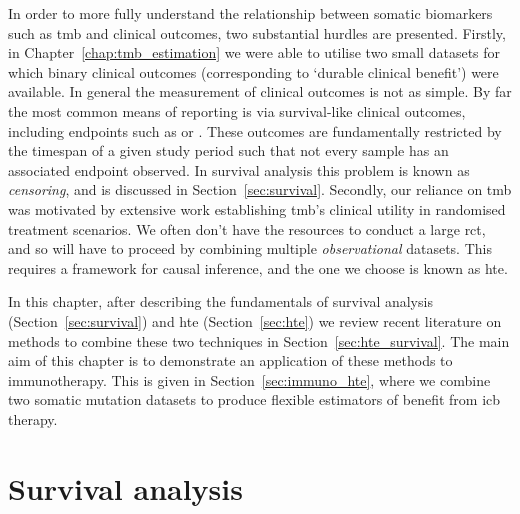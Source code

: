 \documentclass[../thesis.tex]{subfiles}
\begin{document}
In order to more fully understand the relationship between somatic biomarkers such as \gls{tmb} and clinical outcomes, two substantial hurdles are presented. Firstly, in Chapter~\ref{chap:tmb_estimation} we were able to utilise two small datasets for which binary clinical outcomes (corresponding to `durable clinical benefit') were available. In general the measurement of clinical outcomes is not as simple. By far the most common means of reporting is via survival-like clinical outcomes, including endpoints such as  or . These outcomes are fundamentally restricted by the timespan of a given study period such that not every sample has an associated endpoint observed. In survival analysis this problem is known as \textit{censoring}, and is discussed in Section~\ref{sec:survival}. Secondly, our reliance on \gls{tmb} was motivated by extensive work establishing \gls{tmb}'s clinical utility in randomised treatment scenarios. We often don't have the resources to conduct a large \gls{rct}, and so will have to proceed by combining multiple \emph{observational} datasets. This requires a framework for causal inference, and the one we choose is known as \gls{hte}.

In this chapter, after describing the fundamentals of survival analysis (Section~\ref{sec:survival}) and \gls{hte} (Section~\ref{sec:hte}) we review recent literature on methods to combine these two techniques in Section~\ref{sec:hte_survival}. The main aim of this chapter is to demonstrate an application of these methods to immunotherapy. This is given in Section~\ref{sec:immuno_hte}, where we combine two somatic mutation datasets to produce flexible estimators of benefit from \gls{icb} therapy. 
\section{Survival analysis \label{sec:survival}}
\end{document}
